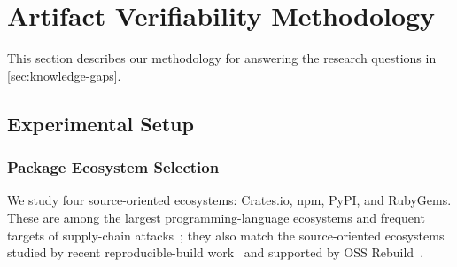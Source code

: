 



\section{Artifact Verifiability Methodology}
\label{sec:methodology}

This section describes our methodology for answering the research questions in \cref{sec:knowledge-gaps}.

\subsection{Experimental Setup}
\label{subsec:experimental-setup}

\subsubsection{Package Ecosystem Selection}
We study four source-oriented ecosystems: Crates.io, npm, PyPI, and RubyGems. These are among the largest programming-language ecosystems and frequent targets
of supply-chain attacks~\cite{ohm_backstabbers_2020}; they also match the source-oriented ecosystems studied by recent reproducible-build work~\cite{benedetti_empirical_2025} and supported by OSS Rebuild~\cite{google_oss_rebuild}. 


